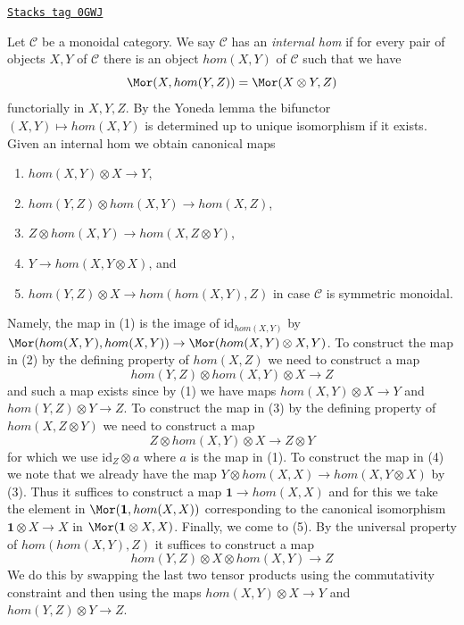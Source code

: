 \begin{remark}
\label{categories-remark-internal-hom-monoidal}
\href{https://stacks.math.columbia.edu/tag/0GWJ}{\texttt{Stacks tag 0GWJ}}

Let $\mathcal{C}$ be a monoidal category. We say $\mathcal{C}$ has
an {\it internal hom} if for every pair of objects $X, Y$ of $\mathcal{C}$
there is an object $hom(X, Y)$ of $\mathcal{C}$ such that we have
$$
\Mor(X, hom(Y, Z)) = \Mor(X \otimes Y, Z)
$$
functorially in $X, Y, Z$. By the Yoneda lemma the bifunctor
$(X, Y) \mapsto hom(X, Y)$ is determined up to unique isomorphism
if it exists. Given an internal hom we obtain canonical maps
\begin{enumerate}
\item $hom(X, Y) \otimes X \to Y$,
\item $hom(Y, Z) \otimes hom(X, Y) \to hom(X, Z)$,
\item $Z \otimes hom(X, Y) \to hom(X, Z \otimes Y)$,
\item $Y \to hom(X, Y \otimes X)$, and
\item $hom(Y, Z) \otimes X \to hom(hom(X, Y), Z)$ in case
$\mathcal{C}$ is symmetric monoidal.
\end{enumerate}
Namely, the map in (1) is the image of $\text{id}_{hom(X, Y)}$
by $\Mor(hom(X, Y), hom(X, Y)) \to \Mor(hom(X, Y) \otimes X, Y)$.
To construct the map in (2) by the defining property of $hom(X, Z)$
we need to construct a map
$$
hom(Y, Z) \otimes hom(X, Y) \otimes X \longrightarrow Z
$$
and such a map exists since by (1) we have
maps $hom(X, Y) \otimes X \to Y$ and $hom(Y, Z) \otimes Y \to Z$.
To construct the map in (3) by the defining property of $hom(X, Z \otimes Y)$
we need to construct a map
$$
Z \otimes hom(X, Y) \otimes X \to Z \otimes Y
$$
for which we use $\text{id}_Z \otimes a$ where
$a$ is the map in (1). To construct the map in (4)
we note that we already have the map
$Y \otimes hom(X, X) \to hom(X, Y \otimes X)$ by (3).
Thus it suffices to construct a map $\mathbf{1} \to hom(X, X)$
and for this we take the element in $\Mor(\mathbf{1}, hom(X, X))$
corresponding to the canonical isomorphism $\mathbf{1} \otimes X \to X$
in $\Mor(\mathbf{1} \otimes X, X)$.
Finally, we come to (5). By the universal property of
$hom(hom(X, Y), Z)$ it suffices to construct a map
$$
hom(Y, Z) \otimes X \otimes hom(X, Y) \longrightarrow Z
$$
We do this by swapping the last two tensor products using the
commutativity constraint and then using the maps
$hom(X, Y) \otimes X \to Y$ and $hom(Y, Z) \otimes Y \to Z$.
\end{remark}

